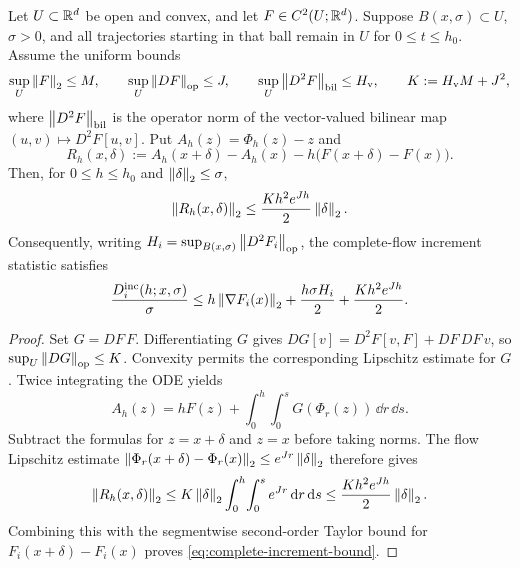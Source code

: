\begin{proposition}
\label{prop:complete-increment}
Let $U\subset\mathbb R^d$ be open and convex, and let $F\in C^2(U;\mathbb R^d)$.
Suppose $B(x,\sigma)\subset U$, $\sigma>0$, and all trajectories starting
in that ball remain in $U$ for $0\leq t\leq h_0$. Assume the uniform bounds
\begin{equation}
 \sup_U\left\lVert F\right\rVert_2\leq M,\qquad
 \sup_U\left\lVert DF\right\rVert_{\rm op}\leq J,\qquad
 \sup_U\left\lVert D^2F\right\rVert_{\rm bil}\leq H_{\rm v},\qquad
 K:=H_{\rm v}M+J^2,
 \label{eq:complete-constants}
\end{equation}
where $\left\lVert D^2F\right\rVert_{\rm bil}$ is the operator norm of the vector-valued
bilinear map $(u,v)\mapsto D^2F[u,v]$. Put
$A_h(z)=\Phi_h(z)-z$ and
\begin{equation}
 R_h(x,\delta):=A_h(x+\delta)-A_h(x)
              -h\bigl(F(x+\delta)-F(x)\bigr).
 \label{eq:complete-remainder-definition}
\end{equation}
Then, for $0\leq h\leq h_0$ and $\left\lVert \delta\right\rVert_2\leq\sigma$,
\begin{equation}
 \left\lVert R_h(x,\delta)\right\rVert_2
 \leq \frac{K h^2e^{Jh}}{2}\left\lVert \delta\right\rVert_2.
 \label{eq:complete-remainder-bound}
\end{equation}
Consequently, writing
$H_i=\sup_{B(x,\sigma)}\left\lVert D^2F_i\right\rVert_{\rm op}$, the complete-flow
increment statistic satisfies
\begin{equation}
 \frac{D_i^{\rm inc}(h;x,\sigma)}{\sigma}
 \leq h\left\lVert \nabla F_i(x)\right\rVert_2
       +\frac{h\sigma H_i}{2}
       +\frac{K h^2e^{Jh}}{2}.
 \label{eq:complete-increment-bound}
\end{equation}
\end{proposition}

\begin{proof}
Set $G=DF\,F$. Differentiating $G$ gives
$DG[v]=D^2F[v,F]+DF\,DF\,v$, so
$\sup_U\left\lVert DG\right\rVert_{\rm op}\leq K$. Convexity permits the corresponding
Lipschitz estimate for $G$. Twice integrating the ODE yields
\begin{equation}
 A_h(z)=hF(z)+\int_0^h\!\int_0^s G(\Phi_r(z))\,\dd r\,\dd s.
 \label{eq:complete-double-integral}
\end{equation}
Subtract the formulas for $z=x+\delta$ and $z=x$ before taking norms.
The flow Lipschitz estimate
$\left\lVert \Phi_r(x+\delta)-\Phi_r(x)\right\rVert_2\leq e^{Jr}\left\lVert \delta\right\rVert_2$
therefore gives
\[
 \left\lVert R_h(x,\delta)\right\rVert_2
 \leq K\left\lVert \delta\right\rVert_2\int_0^h\!\int_0^s e^{Jr}\,\mathrm d r\,\mathrm d s
 \leq\frac{K h^2 e^{Jh}}2\left\lVert \delta\right\rVert_2.
\]
Combining this with the segmentwise second-order Taylor bound for
$F_i(x+\delta)-F_i(x)$ proves \eqref{eq:complete-increment-bound}.
\end{proof}

